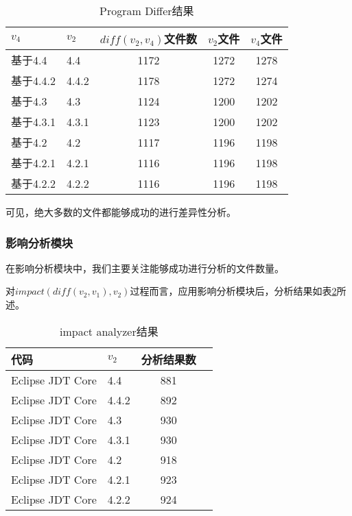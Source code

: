 \begin{table}[H]
	\caption{Program Differ结果}
	\label{data_differ_3}
	\centering
	\begin{tabular}{llccc}
		\toprule[1.5pt]
		{\heiti $v_4$} & {\heiti $v_2$} & {\heiti $diff(v_2,v_4)$文件数} & {\heiti $v_2$文件} & {\heiti $v_4$文件} \\\midrule[1pt]
		基于4.4 & 4.4	& 1172 & 1272 &	1278\\		
		基于4.4.2 & 4.4.2 & 1178 & 1272 & 1274		\\
		基于4.3 & 4.3 	 & 1124 & 1200	& 1202		\\
		基于4.3.1 & 4.3.1  & 1123 & 1200	& 1202		\\
		基于4.2 & 4.2 	& 1117 & 1196 & 1198		\\
		基于4.2.1 & 4.2.1 & 1116 & 1196	& 1198		\\
		基于4.2.2 & 4.2.2  & 1116 & 1196 & 1198		\\
		\bottomrule[1.5pt]
	\end{tabular}
\end{table}

可见，绝大多数的文件都能够成功的进行差异性分析。



\subsubsection{影响分析模块}

在影响分析模块中，我们主要关注能够成功进行分析的文件数量。

对$impact(diff(v_2,v_1),v_2)$过程而言，应用影响分析模块后，分析结果如表\ref {data_impact_1}所述。

\begin{table}[H]
	\caption{impact analyzer结果}
	\label{data_impact_1}
	\centering
	\begin{tabular}{llcc}
		\toprule[1.5pt]
		{\heiti 代码} & {\heiti $v_2$} & {\heiti 分析结果数}  \\\midrule[1pt]
		Eclipse JDT Core & 4.4	 & 881	\\
		Eclipse JDT Core & 4.4.2 & 892 	\\
		Eclipse JDT Core & 4.3	 & 930		\\
		Eclipse JDT Core & 4.3.1 & 930 	\\
		Eclipse JDT Core & 4.2 	 &	918		\\
		Eclipse JDT Core & 4.2.1 & 923	\\
		Eclipse JDT Core & 4.2.2  & 924		\\
		\bottomrule[1.5pt]
	\end{tabular}
\end{table}

